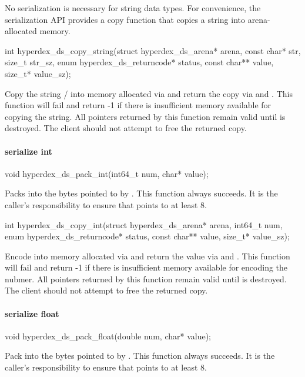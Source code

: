No serialization is necessary for string data types.  For convenience, the
serialization API provides a copy function that copies a string into
arena-allocated memory.

\begin{ccode}
int hyperdex_ds_copy_string(struct hyperdex_ds_arena* arena, const char* str,
                            size_t str_sz, enum hyperdex_ds_returncode* status,
                            const char** value, size_t* value_sz);
\end{ccode}
Copy the string / into memory allocated via
 and return the copy via  and .  This
function will fail and return -1 if there is insufficient memory available for
copying the string.  All pointers returned by this function remain valid until
 is destroyed.  The client should not attempt to free the returned
copy.

\paragraph{serialize int}

\begin{ccode}
void hyperdex_ds_pack_int(int64_t num, char* value);
\end{ccode}
Packs  into the bytes pointed to by .  This
function always succeeds.  It is the caller's responsibility to ensure that
 points to at least \unit{8}{\byte}.

\begin{ccode}
int hyperdex_ds_copy_int(struct hyperdex_ds_arena* arena, int64_t num,
                         enum hyperdex_ds_returncode* status,
                         const char** value, size_t* value_sz);
\end{ccode}
Encode  into memory allocated via  and return
the value via  and .  This function will fail and
return -1 if there is insufficient memory available for encoding the nubmer.
All pointers returned by this function remain valid until  is
destroyed.  The client should not attempt to free the returned copy.

\paragraph{serialize float}

\begin{ccode}
void hyperdex_ds_pack_float(double num, char* value);
\end{ccode}
Pack  into the bytes pointed to by .  This
function always succeeds.  It is the caller's responsibility to ensure that
 points to at least \unit{8}{\byte}.

